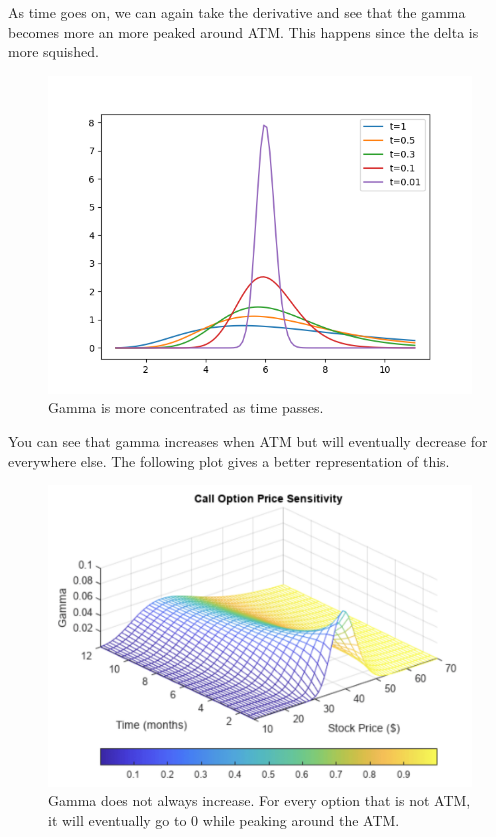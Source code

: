 \documentclass{article}
\begin{document}
    \begin{theorem}
      As time goes on, we can again take the derivative and see that the gamma becomes more an more peaked around ATM. This happens since the delta is more squished. 
      \begin{figure}[H]
        \centering 
        \includegraphics[scale=0.45]{img/gamma_wrt_time.png}
        \caption{Gamma is more concentrated as time passes.} 
        \label{fig:gamma_wrt_time}
      \end{figure}
      You can see that gamma increases when ATM but will eventually decrease for everywhere else. The following plot gives a better representation of this. 
      \begin{figure}[H]
        \centering 
        \includegraphics[scale=0.45]{img/gamma_surface.png}
        \caption{Gamma does not always increase. For every option that is not ATM, it will eventually go to $0$ while peaking around the ATM. } 
        \label{fig:gamma_surface}
      \end{figure}
    \end{theorem}
\end{document}
